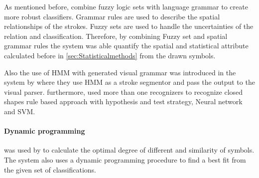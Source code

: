 As mentioned before,\cite{visualpattern43,Cali63} combine fuzzy logic sets with language grammar to create more robust classifiers. Grammar rules are used to describe the spatial relationships of the strokes. Fuzzy sets are used to handle the uncertainties of the relation and classification. Therefore, by combining Fuzzy set and spatial grammar rules the system was able quantify the spatial and statistical attribute calculated before in \ref{sec:Statisticalmethods} from the drawn symbols. 

Also the use of HMM with generated visual grammar was introduced in the system by \cite{HMM53} where they use HMM as a stroke segmentor and pass the output to the visual parser. furthermore, \cite{SmartSketch56} used more than one recognizers to recognize closed shapes rule based approach with hypothesis and test strategy, Neural network and SVM.

\paragraph{Dynamic programming}
\label{sec:DynamicProgramming}
 was used by \cite {Mathpad46,templatefrag21}  to calculate the optimal degree of different and similarity of symbols. The system also uses a dynamic programming procedure to find a best fit from the given set of classifications. 

